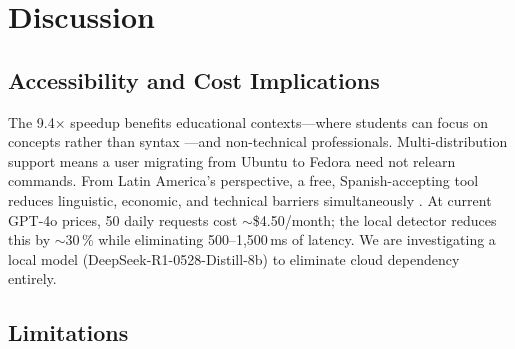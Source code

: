 \documentclass[10pt,a4paper]{article}
\begin{document}
\section{Discussion}
\label{sec:discussion}

\subsection{Accessibility and Cost Implications}
\label{subsec:implications}

The 9.4$\times$ speedup benefits educational contexts---where students can focus on concepts rather than syntax \citep{Norman2013}---and non-technical professionals. Multi-distribution support means a user migrating from Ubuntu to Fedora need not relearn commands. From Latin America's perspective, a free, Spanish-accepting tool reduces linguistic, economic, and technical barriers simultaneously \citep{CEPAL2023, Warschauer2004}. At current GPT-4o prices, 50 daily requests cost $\sim$\$4.50/month; the local detector reduces this by $\sim$30\,\% while eliminating 500--1,500\,ms of latency. We are investigating a local model (DeepSeek-R1-0528-Distill-8b) \citep{DeepSeek2025} to eliminate cloud dependency entirely.

\subsection{Limitations}
\label{subsec:limitations}
\end{document}
